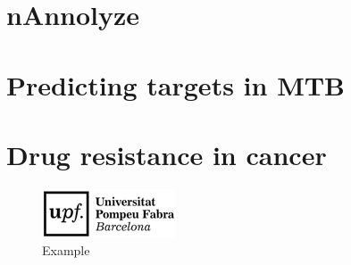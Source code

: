 \documentclass[12pt, a4paper,twoside]{tesi_upf}
\begin{document}
\chapter{nAnnolyze}
\chapter{Predicting targets in MTB}
\chapter{Drug resistance in cancer}



\begin{figure}[b]
  \centering
  \includegraphics[scale=0.5]{../figures/logo_upf.png}
    \caption{Example}
    \label{fig:logo}
\end{figure}





%



\backmatter
\printindex

\printbibliography
\end{document}
